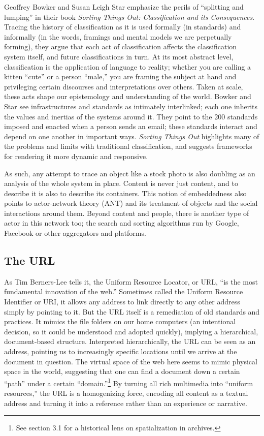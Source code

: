 Geoffrey Bowker and Susan Leigh Star emphasize the perils of ``splitting and lumping'' in their book \emph{Sorting Things Out: Classification and its Consequences}. Tracing the history of classification as it is used formally (in standards) and informally (in the words, framings and mental models we are perpetually forming), they argue that each act of classification affects the classification system itself, and future classifications in turn. At its most abstract level, classification is the application of language to reality; whether you are calling a kitten ``cute'' or a person ``male,'' you are framing the subject at hand and privileging certain discourses and interpretations over others. Taken at scale, these acts shape our epistemology and understanding of the world. Bowker and Star see infrastructures and standards as intimately interlinked; each one inherits the values and inertias of the systems around it. They point to the 200 standards imposed and enacted when a person sends an email; these standards interact and depend on one another in important ways.\autocite[7]{bowker_sorting_2000} \emph{Sorting Things Out} highlights many of the problems and limits with traditional classification, and suggests frameworks for rendering it more dynamic and responsive.

As such, any attempt to trace an object like a stock photo is also doubling as an analysis of the whole system in place. Content is never just content, and to describe it is also to describe its containers. This notion of embeddedness also points to actor-network theory (ANT) and its treatment of objects and the social interactions around them. Beyond content and people, there is another type of actor in this network too; the search and sorting algorithms run by Google, Facebook or other aggregators and platforms.

\subsection{The URL}

As Tim Berners-Lee tells it, the Uniform Resource Locator, or URL, ``is the most fundamental innovation of the web.''\autocite[39]{berners-lee_weaving_2000} Sometimes called the Uniform Resource Identifier or URI, it allows any address to link directly to any other address simply by pointing to it. But the URL itself is a remediation of old standards and practices. It mimics the file folders on our home computers (an intentional decision, so it could be understood and adopted quickly), implying a hierarchical, document-based structure. Interpreted hierarchically, the URL can be seen as an address, pointing us to increasingly specific locations until we arrive at the document in question. The virtual space of the web here seems to mimic physical space in the world, suggesting that one can find a document down a certain ``path'' under a certain ``domain.''\footnote{See section 3.1 for a historical lens on spatialization in archives.} By turning all rich multimedia into ``uniform resources,'' the URL is a homogenizing force, encoding all content as a textual address and turning it into a reference rather than an experience or narrative.


